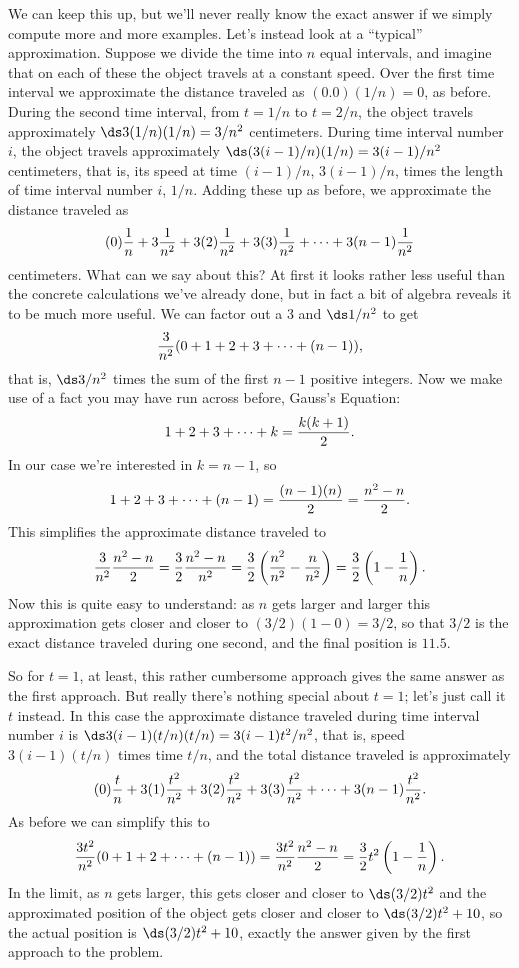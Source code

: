 \begin{solution}
We can keep this up, but we'll never really know the exact answer if
we simply compute more and more examples. Let's instead look at a
``typical'' approximation. Suppose we divide the time into $n$ equal
intervals, and imagine that on each of these the object travels at a
constant speed. Over the first time interval we approximate the
distance traveled as $(0.0)(1/n)=0$, as before. During the second time
interval, from $t=1/n$ to $t=2/n$, the object travels approximately
$\ds 3(1/n)(1/n)=3/n^2$ centimeters. During time interval number $i$, the
object travels approximately $\ds (3(i-1)/n)(1/n)=3(i-1)/n^2$
centimeters, that is, its speed at time $(i-1)/n$, $3(i-1)/n$, times
the length of time interval number $i$, $1/n$.
Adding these up as before, we approximate the distance traveled as
$$
  (0){1\over n}+3{1\over n^2}+3(2){1\over n^2}+
  3(3){1\over n^2}+\cdots+3(n-1){1\over n^2}
$$
centimeters. What can we say about this? At first it looks rather less
useful than the concrete calculations we've already done, but in fact
a bit of algebra reveals it to be much more useful. We can factor out
a 3 and $\ds 1/n^2$ to get
$$
  {3\over n^2}(0+1+2+3+\cdots+(n-1)),
$$
that is, $\ds 3/n^2$ times the sum of the first $n-1$ positive
integers. Now we make use of a fact you may have run across before, Gauss's Equation:
$$
  1+2+3+\cdots+k={k(k+1)\over2}.
$$
In our case we're interested in $k=n-1$, so
$$
  1+2+3+\cdots+(n-1)={(n-1)(n)\over2}={n^2-n\over2}.
$$
This simplifies the approximate distance traveled to 
$$
  {3\over n^2}{n^2-n\over2}={3\over2}{n^2-n\over n^2}=
  {3\over2}\left({n^2\over n^2}-{n\over n^2}\right)=
  {3\over2}\left(1-{1\over n}\right).
$$
Now this is quite easy to understand: as $n$ gets larger and larger
this approximation gets closer and closer to $(3/2)(1-0)=3/2$, so that
$3/2$ is the exact distance traveled during one second, and the final
position is $11.5$.

So for $t=1$, at least, this rather cumbersome approach gives the same
answer as the first approach. But really there's nothing special about
$t=1$; let's just call it $t$ instead. In this case the approximate
distance traveled during time interval number $i$ is $\ds
3(i-1)(t/n)(t/n)=3(i-1)t^2/n^2$, that is, speed $3(i-1)(t/n)$ times
time $t/n$, and the total distance traveled is approximately
$$
  (0){t\over n}+3(1){t^2\over n^2}+3(2){t^2\over n^2}+
  3(3){t^2\over n^2}+\cdots+3(n-1){t^2\over n^2}.
$$
As before we can simplify this to
$$
  {3t^2\over n^2}(0+1+2+\cdots+(n-1))={3t^2\over n^2}{n^2-n\over2}=
  {3\over2}t^2\left(1-{1\over n}\right).
$$ 
In the limit, as $n$ gets larger, this gets closer and closer to $\ds
(3/2)t^2$ and the approximated position of the object gets closer and
closer to $\ds (3/2)t^2+10$, so the actual position is $\ds
(3/2)t^2+10$, exactly the answer given by the first approach to the
problem.
\end{solution}

